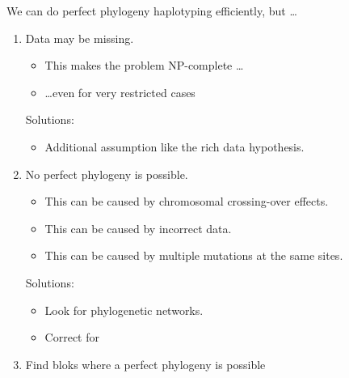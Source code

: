 \documentclass[]{beamer}
\begin{document}
	\begin{frame}{We can do perfect phylogeny haplotyping efficiently, but \dots}
	\begin{enumerate}
	\item  {\color{red} Data may be missing.}
	\begin{itemize}
	\item <alert@1> {\color {black} This makes the problem NP-complete \dots }
	\item <alert@1> {\color {black} \dots even for very restricted cases}
	\end{itemize}
 {\color{green} Solutions:}
	\begin{itemize}
	\item <alert@1> {\color {black} Additional assumption like the rich data hypothesis.}
	\end{itemize}
	\item {\color{red} No  perfect phylogeny is possible.}
	
	\begin{itemize}
	\item <alert@1> {\color {black} This can be caused by chromosomal crossing-over effects.}
	\item <alert@1> {\color {black} This can be caused by incorrect data.}
	\item <alert@1> {\color {black} This can be caused by multiple mutations at the same sites.}
	\end{itemize}
{\color{green} Solutions:}
	\begin{itemize}
	\item <alert@1> {\color {black} Look for phylogenetic networks.}
	\item <alert@1> {\color {black} Correct for}
	\end{itemize}
	\item {\color{red} Find bloks where a perfect phylogeny is possible}
	\end{enumerate}
	
	\end{frame}
\end{document}
